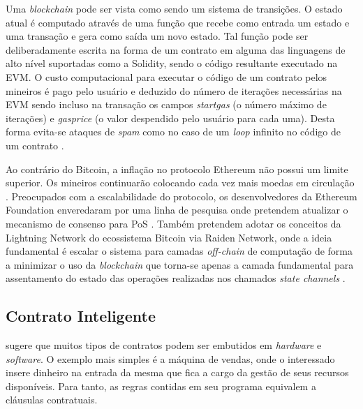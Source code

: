 \documentclass[a4paper,12pt]{monografia}
\theoremstyle{plain}
\theoremstyle{definition}
\theoremstyle{remark}
\begin{document}
Uma \textit{blockchain} pode ser vista como sendo um sistema de transi\c{c}\~oes.
O estado atual \'e computado atrav\'es de uma fun\c{c}\~ao que recebe como entrada um estado e uma transa\c{c}\~ao e gera como sa\'ida um novo estado.
Tal fun\c{c}\~ao pode ser deliberadamente escrita na forma de um contrato em alguma das linguagens de alto n\'ivel suportadas como a Solidity, sendo o c\'odigo resultante executado na EVM.
O custo computacional para executar o c\'{o}digo de um contrato pelos mineiros \'{e} pago pelo usu\'{a}rio e deduzido do n\'{u}mero de itera\c{c}\~{o}es necess\'{a}rias na EVM sendo incluso na transa\c{c}\~{a}o os campos \textit{startgas} (o n\'{u}mero m\'{a}ximo de itera\c{c}\~{o}es) e \textit{gasprice} (o valor despendido pelo usu\'{a}rio para cada uma).
Desta forma evita-se ataques de \textit{spam} como no caso de um \textit{loop} infinito no c\'{o}digo de um contrato \cite{ethreview}.

Ao contr\'ario do Bitcoin, a infla\c{c}\~ao no protocolo Ethereum n\~ao possui um limite superior. Os mineiros continuar\~ao colocando cada vez mais moedas em circula\c{c}\~ao \cite{ethereumissuance}.
Preocupados com a escalabilidade do protocolo, os desenvolvedores da Ethereum Foundation enveredaram por uma linha de pesquisa onde pretendem atualizar o mecanismo de consenso para PoS \cite{casper}.
Tamb\'em pretendem adotar os conceitos da Lightning Network do ecossistema Bitcoin via Raiden Network, onde a ideia fundamental \'e escalar o sistema para camadas \textit{off-chain} de computa\c{c}\~ao de forma a minimizar o uso da \textit{blockchain} que torna-se apenas a camada fundamental para assentamento do estado das opera\c{c}\~oes realizadas nos chamados \textit{state channels} \cite{plasma}.

\subsection{Contrato Inteligente}
 sugere que muitos tipos de contratos podem ser embutidos em \textit{hardware} e \textit{software}.
O exemplo mais simples \'{e} a m\'{a}quina de vendas, onde o interessado insere dinheiro na entrada da mesma que fica a cargo da gest\~{a}o de seus recursos dispon\'{i}veis.
Para tanto, as regras contidas em seu programa equivalem a cl\'{a}usulas contratuais.
\end{document}
